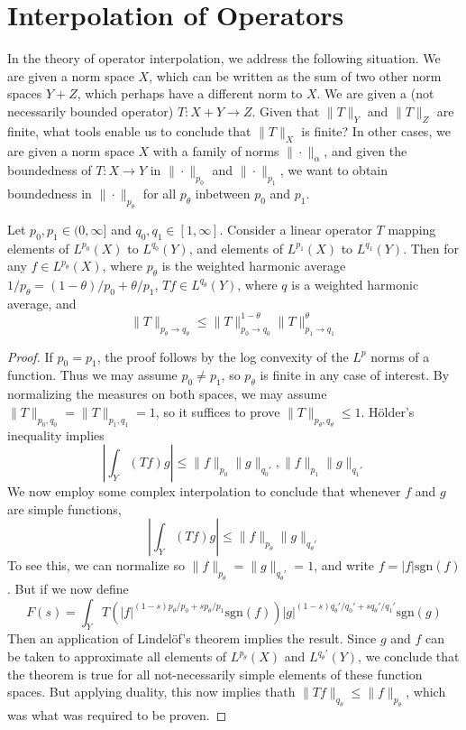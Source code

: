 \section{Interpolation of Operators}

In the theory of operator interpolation, we address the following situation. We are given a norm space $X$, which can be written as the sum of two other norm spaces $Y + Z$, which perhaps have a different norm to $X$. We are given a (not necessarily bounded operator) $T: X + Y \to Z$. Given that $\| T \|_Y$ and $\| T \|_Z$ are finite, what tools enable us to conclude that $\| T \|_X$ is finite? In other cases, we are given a norm space $X$ with a family of norms $\| \cdot \|_\alpha$, and given the boundedness of $T: X \to Y$ in $\| \cdot \|_{p_0}$ and $\| \cdot \|_{p_1}$, we want to obtain boundedness in $\| \cdot \|_{p_\theta}$ for all $p_\theta$ inbetween $p_0$ and $p_1$.

\begin{theorem}
	Let $p_0,p_1 \in (0,\infty]$ and $q_0,q_1 \in [1,\infty]$. Consider a linear operator $T$ mapping elements of $L^{p_0}(X)$ to $L^{q_0}(Y)$, and elements of $L^{p_1}(X)$ to $L^{q_1}(Y)$. Then for any $f \in L^{p_\theta}(X)$, where $p_\theta$ is the weighted harmonic average $1/p_\theta = (1 - \theta)/p_0 + \theta/p_1$, $Tf \in L^{q_\theta}(Y)$, where $q$ is a weighted harmonic average, and
	\[ \| T \|_{p_\theta \to q_\theta} \leq \| T \|_{p_0 \to q_0}^{1-\theta} \| T \|_{p_1 \to q_1}^\theta \]
\end{theorem}
\begin{proof}
	If $p_0 = p_1$, the proof follows by the log convexity of the $L^p$ norms of a function. Thus we may assume $p_0 \neq p_1$, so $p_\theta$ is finite in any case of interest. By normalizing the measures on both spaces, we may assume $\| T \|_{p_0,q_0} = \| T \|_{p_1,q_1} = 1$, so it suffices to prove $\| T \|_{p_\theta,q_\theta} \leq 1$. H\"{o}lder's inequality implies
	\[ \left| \int_Y (Tf) g \right| \leq \| f \|_{p_0} \| g \|_{q_0'}, \| f \|_{p_1} \| g \|_{q_1'} \]
	We now employ some complex interpolation to conclude that whenever $f$ and $g$ are simple functions,
	\[ \left| \int_Y (Tf) g \right| \leq \| f \|_{p_\theta} \| g \|_{q_\theta'} \]
	To see this, we can normalize so $\| f \|_{p_\theta} = \| g \|_{q_\theta'} = 1$, and write $f = |f| \text{sgn}(f)$. But if we now define
	\[ F(s) = \int_Y T(|f|^{(1-s)p_\theta/p_0 + sp_\theta/p_1} \text{sgn}(f)) |g|^{(1-s)q_\theta'/q_0' + sq_\theta'/q_1'} \text{sgn}(g) \]
	Then an application of Lindel\"{o}f's theorem implies the result. Since $g$ and $f$ can be taken to approximate all elements of $L^{p_\theta}(X)$ and $L^{q_\theta'}(Y)$, we conclude that the theorem is true for all not-necessarily simple elements of these function spaces. But applying duality, this now implies thath $\| Tf \|_{q_\theta} \leq \| f \|_{p_\theta}$, which was what was required to be proven.
\end{proof}

